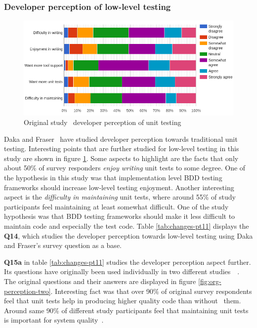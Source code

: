 \subsubsection{Developer perception of low-level testing}
    \begin{figure}[ht]
      \begin{center}
        \includegraphics[width=14.7cm]{images/perception-org.png}
        \caption{Original study~\cite{daka2014survey} developer perception of unit testing}
        \label{fig:org-perception}
      \end{center}
    \end{figure}

Daka and Fraser~\cite{daka2014survey} have studied developer perception towards traditional unit testing. Interesting
points that are further studied for low-level testing in this study are shown in figure \ref{fig:org-perception}. Some
aspects to highlight are the facts that only about 50\% of survey responders \textit{enjoy writing} unit tests to some degree.
One of the hypothesis in this study was that implementation level BDD testing frameworks should increase low-level testing enjoyment.
Another interesting aspect is the \textit{difficulty in maintaining} unit tests, where around 55\% of study participants
feel maintaining at least somewhat difficult. One of the study hypothesis was that BDD testing frameworks should
make it less difficult to maintain code and especially the test code. Table \ref{tab:changes-pt11} displays the \textbf{Q14}, which studies
the developer perception towards low-level testing using Daka and Fraser's survey question as a base.

\textbf{Q15a} in table \ref{tab:changes-pt11} studies the developer perception aspect further. Its questions have originally
been used individually in two different studies~\cite{williams2009effectiveness}~\cite{li2016automatically}. The original
questions and their answers are displayed in figure \ref{fig:org-perception-two}. Interesting fact was that over 90\% of
original survey respondents feel that unit tests help in producing higher quality code than without~\cite{williams2009effectiveness} them.
Around same 90\% of different study participants feel that maintaining unit tests is important for system quality~\cite{li2016automatically}.

